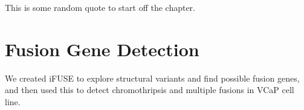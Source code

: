 \begin{savequote}[75mm]
This is some random quote to start off the chapter.
\end{savequote}

\chapter{Fusion Gene Detection}
\setcounter{figure}{-1}
\setcounter{table}{-1}
\setcounter{section}{-1}

We created iFUSE to explore structural variants and find possible fusion genes, and then used this to detect chromothripsis and multiple fusions in VCaP cell line.

